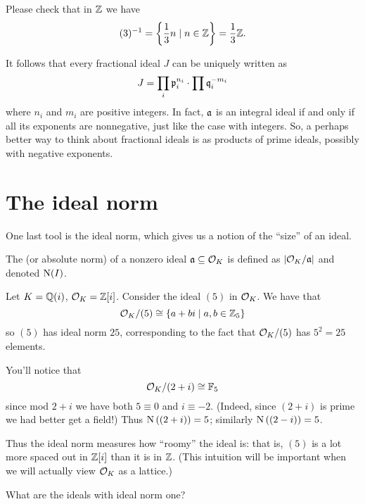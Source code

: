 \begin{example}[$(3)\inv$ in $\ZZ$]
	Please check that in $\ZZ$ we have
	\[ (3)\inv = \left\{ \frac 13 n \mid n \in \ZZ \right\} = \frac 13 \ZZ. \]
\end{example}

It follows that every fractional ideal $J$ can be uniquely written as
\[ J = \prod_i \pp_i^{n_i} \cdot \prod \qq_i^{-m_i} \]
where $n_i$ and $m_i$ are positive integers.
In fact, $\aa$ is an integral ideal if and only if all its exponents are nonnegative,
just like the case with integers.
So, a perhaps better way to think about fractional ideals is
as products of prime ideals, possibly with negative exponents.

\section{The ideal norm}
One last tool is the ideal norm,
which gives us a notion of the ``size'' of an ideal.
\begin{definition}
	The  (or absolute norm)
	of a nonzero ideal $\aa \subseteq \OO_K$ is defined as
	$\left\lvert \OO_K / \aa \right\rvert$ and denoted $\Norm(I)$.
\end{definition}
\begin{example}
	Let $K = \QQ(i)$, $\OO_K = \ZZ[i]$.
	Consider the ideal $(5)$ in $\OO_K$.
	We have that 
	\[ \OO_K / (5) \cong \{ a+bi \mid a,b \in \Zc5 \} \]
	so $(5)$ has ideal norm $25$,
	corresponding to the fact that $\OO_K/(5)$ has $5^2=25$ elements.
\end{example}

\begin{example}
	You'll notice that \[ \OO_K / (2+i) \cong \FF_5 \]
	since mod $2+i$ we have both $5 \equiv 0$ and $i \equiv -2$.
	(Indeed, since $(2+i)$ is prime we had better get a field!)
	Thus $\Norm\left( (2+i) \right) = 5$; similarly $\Norm\left( (2-i) \right) = 5$.
\end{example}

Thus the ideal norm measures how ``roomy'' the ideal is:
that is, $(5)$ is a lot more spaced out in $\ZZ[i]$ than it is in $\ZZ$.
(This intuition will be important when we will actually view $\OO_K$ as a lattice.)

\begin{ques}
	What are the ideals with ideal norm one?
\end{ques}

